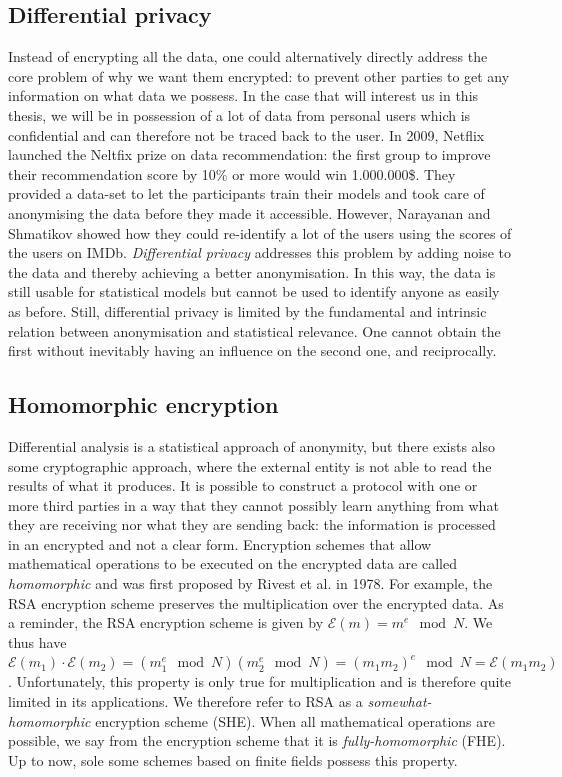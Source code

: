 \subsection{Differential privacy}
Instead of encrypting all the data, one could alternatively directly address the core problem of why we want them encrypted: to prevent other parties to get any information on what data we possess. In the case that will interest us in this thesis, we will be in possession of a lot of data from personal users which is confidential and can therefore not be traced back to the user. In 2009, Netflix launched the Neltfix prize on data recommendation: the first group to improve their recommendation score by 10\% or more would win 1.000.000\$. They provided a data-set to let the participants train their models and took care of anonymising the data before they made it accessible. However, Narayanan and Shmatikov showed how they could re-identify a lot of the users using the scores of the users on IMDb. \emph{Differential privacy} \cite{Dwork2008DifferentialResults} addresses this problem by adding noise to the data and thereby achieving a better anonymisation. In this way, the data is still usable for statistical models but cannot be used to identify anyone as easily as before. Still, differential privacy is limited by the fundamental and intrinsic relation between anonymisation and statistical relevance. One cannot obtain the first without inevitably having an influence on the second one, and reciprocally.

\subsection{Homomorphic encryption}
Differential analysis is a statistical approach of anonymity, but there exists also some cryptographic approach, where the external entity is not able to read the results of what it produces. It is possible to construct a protocol with one or more third parties in a way that they cannot possibly learn anything from what they are receiving nor what they are sending back: the information is processed in an encrypted and not a clear form. Encryption schemes that allow mathematical operations to be executed on the encrypted data are called \emph{homomorphic} and was first proposed by Rivest et al. in 1978. For example, the RSA encryption scheme preserves the multiplication over the encrypted data. As a reminder, the RSA encryption scheme is given by $\mathscr{E}(m)=m^e \mod N$. We thus have $\mathscr{E}(m_1) \cdot  \mathscr{E}(m_2) = \left(m_1^e \mod N \right)\left(m_2^e \mod N \right) = \left(m_1m_2\right)^e \mod N = \mathscr{E}(m_1m_2)$. Unfortunately, this property is only true for multiplication and is therefore quite limited in its applications. We therefore refer to RSA as a \emph{somewhat-homomorphic} encryption scheme (SHE). When all mathematical operations are possible, we say from the encryption scheme that it is \emph{fully-homomorphic} (FHE). Up to now, sole some schemes based on finite fields possess this property. 

